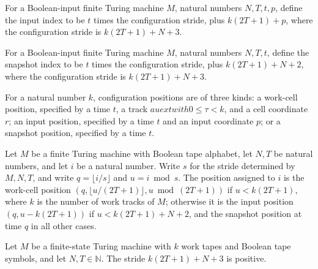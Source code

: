 \begin{definition}
\label{Complexity.inpIdx}
\leanok
{}
For a Boolean-input finite Turing machine $M$, natural numbers $N,T,t,p$, define the
input index to be $t$ times the configuration stride, plus $k(2T+1)+p$, where the
configuration stride is $k(2T+1)+N+3$.
\end{definition}

\begin{definition}
\label{Complexity.snapIdx}
\leanok
{}
For a Boolean-input finite Turing machine $M$, natural numbers $N,T,t$, define the
snapshot index to be $t$ times the configuration stride, plus $k(2T+1)+N+2$, where the
configuration stride is $k(2T+1)+N+3$.
\end{definition}

\begin{definition}
\label{Complexity.CfgPos}
\leanok
For a natural number $k$, configuration positions are of three kinds: a work-cell
position, specified by a time $t$, a track $	au 	ext{ with } 0 \leq \tau < k$, and a
cell coordinate $r$; an input position, specified by a time $t$ and an input coordinate
$p$; or a snapshot position, specified by a time $t$.
\end{definition}

\begin{definition}
\label{Complexity.cfgPos}
\leanok
{}
Let $M$ be a finite Turing machine with Boolean tape alphabet, let $N,T$ be natural
numbers, and let $i$ be a natural number. Write $s$ for the stride determined by
$M,N,T$, and write $q=\lfloor i/s\rfloor$ and $u=i \bmod s$. The position assigned to
$i$ is the work-cell position $(q,\lfloor u/(2T+1)\rfloor,u\bmod(2T+1))$ if $u<k(2T+1)$,
where $k$ is the number of work tracks of $M$; otherwise it is the input position
$(q,u-k(2T+1))$ if $u<k(2T+1)+N+2$, and the snapshot position at time $q$ in all other
cases.
\end{definition}

\begin{theorem}
\label{Complexity.stride_pos}
\leanok
{}
Let $M$ be a finite-state Turing machine with $k$ work tapes and Boolean tape symbols,
and let $N,T\in\mathbb{N}$. The stride $k(2T+1)+N+3$ is positive.
\end{theorem}

